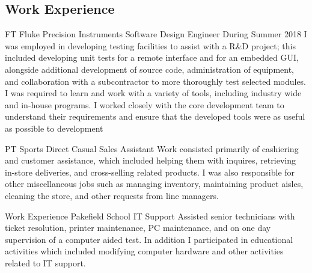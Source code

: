 \documentclass[10pt]{article} %
\begin{document}
\begin{paracol}{2}
\section{Work Experience}





{FT} %
{Fluke Precision Instruments} %
{Software Design Engineer} %
{During Summer 2018 I was employed in developing testing facilities to assist with a R\&D project; this included developing unit tests for a remote interface and for an embedded GUI, alongside additional development of source code, administration of equipment, and collaboration with a subcontractor to more thoroughly test selected modules. I was required to learn and work with a variety of tools, including industry wide and in-house programs. I worked closely with the core development team to understand their requirements and ensure that the developed tools were as useful as possible to development } %


{PT} %
{Sports Direct} %
{Casual Sales Assistant} %
{Work consisted primarily of cashiering and customer assistance, which included helping them with inquires, retrieving in-store deliveries, and cross-selling related products. I was also responsible for other miscellaneous jobs such as managing inventory, maintaining product aisles, cleaning the store, and other requests from line managers.}  %


{Work Experience} %
{Pakefield School} %
{IT Support} %
{Assisted senior technicians with ticket resolution, printer maintenance, PC maintenance, and on one day supervision of a computer aided test. In addition I participated in educational activities which included modifying computer hardware and other activities related to IT support.} %


\end{paracol}
\end{document}
